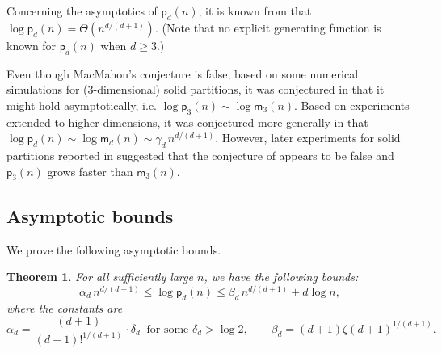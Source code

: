 \documentclass[12pt]{amsart}
\newtheorem{theorem}{Theorem}[section]
\theoremstyle{definition}
\theoremstyle{remark}
\begin{document}
Concerning the asymptotics of $\mathsf{p}_d(n)$, 
it is %
known from 
\cite{bhatia} that $\log \mathsf{p}_{d}(n) = \Theta(n^{d/(d+1)})$. 
(Note that no explicit generating function is known for $\mathsf{p}_d(n)$ when $d \ge 3$.) 

Even though MacMahon's conjecture is false, based on some numerical simulations %
for (3-dimensional) solid partitions, 
it was conjectured in \cite{mr} 
that it might hold asymptotically, i.e. $\log \mathsf{p}_3(n) \sim \log \mathsf{m}_3(n)$. 
Based on experiments extended to higher dimensions, it was conjectured more generally in \cite{bgp} that
$\log \mathsf{p}_d(n) \sim \log \mathsf{m}_d(n) \sim \gamma_d\, n^{d/(d + 1)}.$
However, later experiments for solid partitions reported in \cite{dg} suggested that the conjecture of \cite{mr} appears to be false and $\mathsf{p}_3(n)$ grows faster than $\mathsf{m}_3(n)$.



\subsection{Asymptotic bounds} 




We prove the following asymptotic bounds.

\begin{theorem}\label{thm:one}
For all sufficiently large $n$, 
we have the following bounds: 
$$
\alpha_d \, {n^{d/(d+1)}} \le {\log \mathsf{p}_d(n)}  \le \beta_d \, {n^{d/(d+1)}} + d \log n, %
$$
where the constants are
$$
\alpha_d = \frac{(d+1)}{(d+1)!^{1/(d+1)}}  %
\cdot \delta_d ~\text{ for some } \delta_d > \log 2, 
\qquad \beta_d = (d+1) \zeta(d+1)^{1/(d + 1)}. %
$$
\end{theorem}
\end{document}
